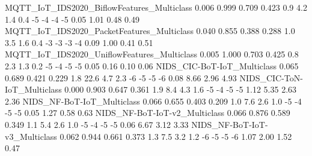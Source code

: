 MQTT_IoT_IDS2020_BiflowFeatures_Multiclass                               0.006      0.999       0.709      0.423                   0.9                   4.2                    1.4                   0.4              -5              -4               -4              -5               0.05               1.01                0.48               0.49
MQTT_IoT_IDS2020_PacketFeatures_Multiclass                               0.040      0.855       0.388      0.288                   1.0                   3.5                    1.6                   0.4              -3              -3               -3              -4               0.09               1.00                0.41               0.51
MQTT_IoT_IDS2020_UniflowFeatures_Multiclass                              0.005      1.000       0.703      0.425                   0.8                   2.3                    1.3                   0.2              -5              -4               -5              -5               0.05               0.16                0.10               0.06
NIDS_CIC-BoT-IoT_Multiclass                                              0.065      0.689       0.421      0.229                   1.8                  22.6                    4.7                   2.3              -6              -5               -5              -6               0.08               8.66                2.96               4.93
NIDS_CIC-ToN-IoT_Multiclass                                              0.000      0.903       0.647      0.361                   1.9                   8.4                    4.3                   1.6              -5              -4               -5              -5               1.12               5.35                2.63               2.36
NIDS_NF-BoT-IoT_Multiclass                                               0.066      0.655       0.403      0.209                   1.0                   7.6                    2.6                   1.0              -5              -4               -5              -5               0.05               1.27                0.58               0.63
NIDS_NF-BoT-IoT-v2_Multiclass                                            0.066      0.876       0.589      0.349                   1.1                   5.4                    2.6                   1.0              -5              -4               -5              -5               0.06               6.67                3.12               3.33
NIDS_NF-BoT-IoT-v3_Multiclass                                            0.062      0.944       0.661      0.373                   1.3                   7.5                    3.2                   1.2              -6              -5               -5              -6               1.07               2.00                1.52               0.47

